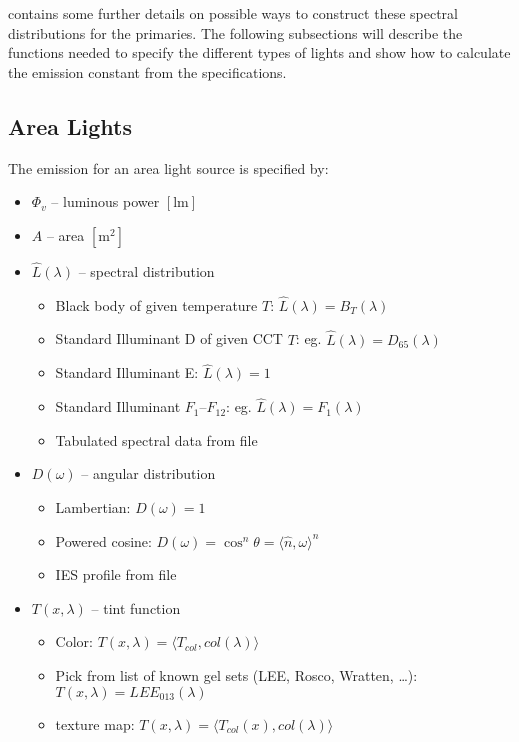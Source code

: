  contains some further details on possible ways
to construct these spectral distributions for the primaries. The following
subsections will describe the functions needed to specify the different types of
lights and show how to calculate the emission constant from the specifications.

\subsection{Area Lights}

The emission for an area light source is specified by:
\begin{itemize}
\item $\Phi_v$ -- luminous power $[\si{\lumen}]$
\item $A$ -- area $[\si{\square\meter}]$
\item $\hat{L}(\lambda)$ -- spectral distribution
  \begin{itemize}\small\it
  \item Black body of given temperature $T$: $\hat{L}(\lambda) = B_T(\lambda)$
  \item Standard Illuminant D of given CCT $T$: eg. $\hat{L}(\lambda) = D_{65}(\lambda)$
  \item Standard Illuminant E: $\hat{L}(\lambda) = 1$
  \item Standard Illuminant $F_1$--$F_{12}$: eg. $\hat{L}(\lambda) = F_1(\lambda)$
  \item Tabulated spectral data from file
  \end{itemize}
\item $D(\omega)$ -- angular distribution
  \begin{itemize}\small\it
  \item Lambertian: $D(\omega) = 1$
  \item Powered cosine: $D(\omega) = \cos^n \theta = \langle \hat n,\omega \rangle^n$
  \item IES profile from file
  \end{itemize}
\item $T(x,\lambda)$ -- tint function
  \begin{itemize}\small\it
  \item Color: $T(x,\lambda) = \langle T_{col}, col(\lambda)\rangle$
  \item Pick from list of known gel sets (LEE, Rosco, Wratten, \ldots): $T(x, \lambda) = LEE_{013} (\lambda)$
  \item texture map: $T(x,\lambda) = \langle T_{col}(x), col(\lambda)\rangle$
  \end{itemize}
\end{itemize}

